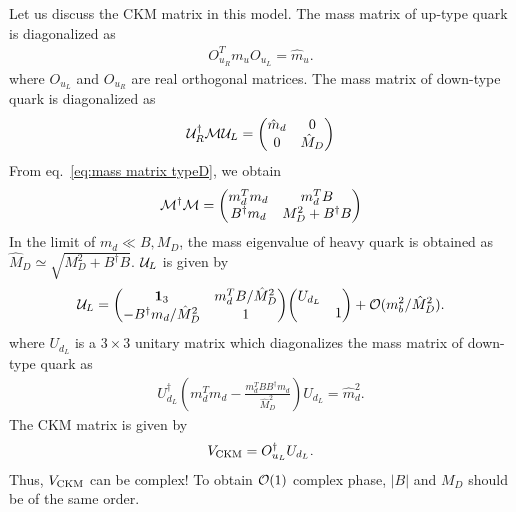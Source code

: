 \documentclass[11pt,a4paper]{article}
\begin{document}
Let us discuss the CKM matrix in this model.
The mass matrix of up-type quark is diagonalized as
\begin{align}
    O_{u_R}^T m_u O_{u_L} = \hat m_u.
\end{align}
where $O_{u_L}$ and $O_{u_R}$ are real orthogonal matrices.
The mass matrix of down-type quark is diagonalized as
\begin{align}
    {\cal U}_R^\dagger
    {\cal M}
    {\cal U}_L = \mqty(\hat m_d & 0 \\ 0 & \hat M_D)
\end{align}
%
From eq.~\eqref{eq:mass matrix typeD}, we obtain
\begin{align}
    {\cal M}^\dagger {\cal M}
    =
    \mqty(m_d^T m_d & m_d^T B \\  B^\dagger m_d & M_D^2 + B^\dagger B )
\end{align}
In the limit of $m_d \ll B, M_D$, the mass eigenvalue of heavy quark is obtained as $\hat M_D \simeq \sqrt{M_D^2 + B^\dagger B}$.
%
${\cal U}_L$ is given by
\begin{align}
    {\cal U}_{L} = \mqty(\vb{1}_{3} & m_d^T B / \hat M_D^2 \\  -B^\dagger m_d / \hat M_D^2   &  1) \mqty(U_{d_{L}} &  \\     &   1) + {\cal O}(m_b^2/\hat M_D^2).
\end{align}
where $U_{d_L}$ is a $3\times 3$ unitary matrix which diagonalizes the mass matrix of down-type quark as
\begin{align}
    U_{d_L}^\dagger \left( m_{d}^T m_{d}-\frac{m_{d}^T B B^\dagger m_{d}}{\hat M_D^2} \right) U_{d_L} = \hat m_d^2.
\end{align}
%
The CKM matrix is given by
\begin{align}
    V_{\rm CKM} = O_{u_L}^\dagger U_{d_L}.
\end{align}
Thus, $V_{\rm CKM}$ can be complex! To obtain ${\cal O}(1)$ complex phase, $|B|$ and $M_D$ should be of the same order.
\end{document}
